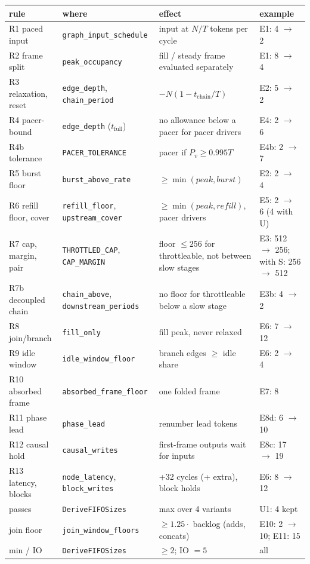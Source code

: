 \documentclass[10pt,a4paper]{article}
\newcommand{\code}[1]{\texttt{#1}}
\newcommand{\Tg}{T}           %
\newcommand{\NF}{N}            %
\begin{document}
\begin{center}\small
\begin{tabular}{@{}p{}p{}p{}p{}@{}}
\toprule
rule & where & effect & example\\
\midrule
R1 paced input & \code{graph\_input\_schedule} & input at $\NF/\Tg$ tokens per cycle & E1: 4 $\to$ 2\\
R2 frame split & \code{peak\_occupancy} & fill / steady frame evaluated separately & E1: 8 $\to$ 4\\
R3 relaxation, reset & \code{edge\_depth}, \code{chain\_period} & $-\NF(1-t_{\mathrm{chain}}/\Tg)$ & E2: 5 $\to$ 2\\
R4 pacer-bound & \code{edge\_depth} ($t_{\mathrm{full}}$) & no allowance below a pacer for pacer drivers & E4: 2 $\to$ 6\\
R4b tolerance & \code{PACER\_TOLERANCE} & pacer if $P_v\ge0.995\Tg$ & E4b: 2 $\to$ 7\\
R5 burst floor & \code{burst\_above\_rate} & $\ge\min(\mathit{peak},\mathit{burst})$ & E2: 2 $\to$ 4\\
R6 refill floor, cover & \code{refill\_floor}, \code{upstream\_cover} & $\ge\min(\mathit{peak},\mathit{refill})$, pacer drivers & E5: 2 $\to$ 6 (4 with U)\\
R7 cap, margin, pair & \code{THROTTLED\_CAP}, \code{CAP\_MARGIN} & floor $\le256$ for throttleable, not between slow stages & E3: 512 $\to$ 256; with S: 256 $\to$ 512\\
R7b decoupled chain & \code{chain\_above}, \code{downstream\_periods} & no floor for throttleable below a slow stage & E3b: 4 $\to$ 2\\
R8 join/branch & \code{fill\_only} & fill peak, never relaxed & E6: 7 $\to$ 12\\
R9 idle window & \code{idle\_window\_floor} & branch edges $\ge$ idle share & E6: 2 $\to$ 4\\
R10 absorbed frame & \code{absorbed\_frame\_floor} & one folded frame & E7: 8\\
R11 phase lead & \code{phase\_lead} & renumber lead tokens & E8d: 6 $\to$ 10\\
R12 causal hold & \code{causal\_writes} & first-frame outputs wait for inputs & E8c: 17 $\to$ 19\\
R13 latency, blocks & \code{node\_latency}, \code{block\_writes} & +32 cycles (+ extra), block holds & E6: 8 $\to$ 12\\
passes & \code{DeriveFIFOSizes} & max over 4 variants & U1: 4 kept\\
join floor & \code{join\_window\_floors} & $\ge1.25\cdot$ backlog (adds, concats) & E10: 2 $\to$ 10; E11: 15\\
min / IO & \code{DeriveFIFOSizes} & $\ge2$; IO $=5$ & all\\
\bottomrule
\end{tabular}
\end{center}
\end{document}

